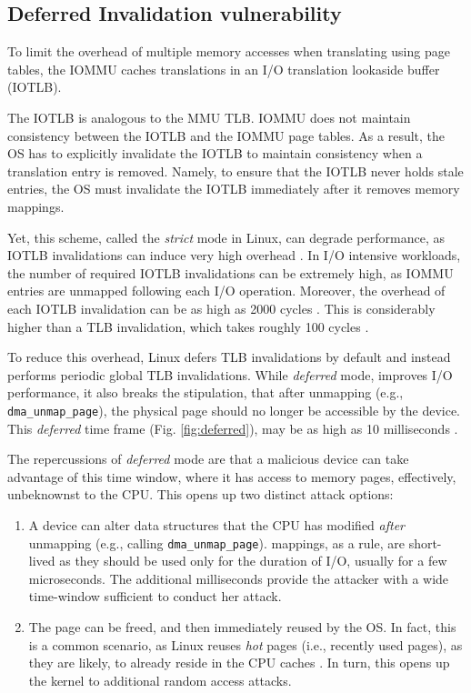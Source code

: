 \subsection{Deferred Invalidation vulnerability}\label{sec:deferred}

To limit the overhead of multiple memory accesses when translating \iova{} using page tables, the IOMMU caches translations in an I/O translation lookaside buffer (IOTLB). 

The IOTLB is analogous to the MMU TLB. IOMMU does not maintain consistency between the IOTLB and the IOMMU page tables. As a result, the OS has to explicitly invalidate the IOTLB to maintain consistency when a translation entry is removed. Namely, to ensure that the IOTLB never holds stale entries, the OS must invalidate the IOTLB immediately after it removes memory mappings. 

Yet, this scheme, called the \emph{strict} mode in Linux, can degrade performance, as IOTLB invalidations can induce very high overhead \cite{MMT16,MSMT18,Peleg15}. In I/O intensive workloads, the number of required IOTLB invalidations can be extremely high, as IOMMU entries are unmapped following each I/O operation. Moreover, the overhead of each IOTLB invalidation can be as high as 2000 cycles \cite{ABYTS11}. This is considerably higher than a TLB invalidation, which takes roughly 100 cycles \cite{Han14}. 

To reduce this overhead, Linux defers TLB invalidations by default and instead performs periodic global TLB invalidations. While \emph{deferred} mode, improves I/O performance, it also breaks the stipulation, that after unmapping (e.g., \texttt{dma\_unmap\_page}), the physical page should no longer be accessible by the device. This \emph{deferred} time frame (Fig. \ref{fig:deferred}), may be as high as 10 milliseconds \cite{MSMT18}.

The repercussions of \emph{deferred} mode are that a malicious device can take advantage of this time window, where it has access to memory pages, effectively, unbeknownst to the CPU. This opens up two distinct attack options:

\begin{enumerate}
    \item A device can alter data structures that the CPU has modified \emph{after} unmapping (e.g., calling \texttt{dma\_unmap\_page}).
    \iova{} mappings, as a rule, are short-lived as they should be used only for the duration of I/O, usually for a few microseconds. The additional milliseconds provide the attacker with a wide time-window sufficient to conduct her attack.
    \item The page can be freed, and then immediately reused by the OS. In fact, this is a common scenario, as Linux reuses \emph{hot} pages (i.e., recently used pages), as they are likely, to already reside in the CPU caches \cite{hotcold}. In turn, this opens up the kernel to additional random access attacks.
\end{enumerate}

